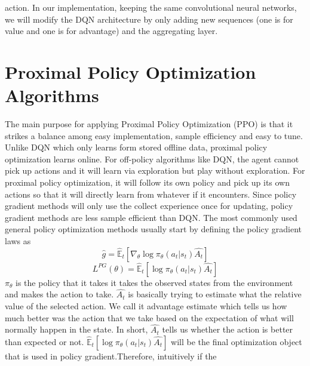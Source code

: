 \documentclass[%
,aps%
 ,twocolumn%
 ,secnumarabic%
,amssymb, amsmath,nobibnotes, aps, prl, floatfix]{revtex4-1}
\begin{document}
action. In our implementation, keeping the same convolutional neural networks, we will modify the DQN architecture by only adding new sequences (one is for value and one is for advantage) and the aggregating layer.

\section{ Proximal Policy Optimization Algorithms}
The main purpose for applying Proximal Policy Optimization (PPO) is that it strikes a balance among easy implementation, sample efficiency and easy to tune. Unlike DQN which only learns form stored offline data, proximal policy optimization learns online. For off-policy algorithms like DQN, the agent cannot pick up actions and it will learn via exploration but play without exploration. For proximal policy optimization, it will follow its own policy and pick up its own actions so that it will directly learn from whatever if it encounters. Since policy gradient methods will only use the collect experience once for updating, policy gradient methods are less sample efficient than DQN. The most commonly used general policy optimization methods usually start by defining the policy gradient laws as $$\hat{g} = \hat{\mathbb{E}}_{t}[\nabla_{\theta}\log\pi_{\theta}(a_{t}|s_{t})\hat{A_t}] $$ 
$$L^{PG}(\theta) = \hat{\mathbb{E}}_{t}[\log\pi_{\theta}(a_{t}|s_{t})\hat{A_t}] $$ $\pi_{\theta}$ is the policy that it takes it takes the observed states from the environment and makes the action to take. $\hat{A_t}$ is basically trying to estimate what the relative value of the selected action. We call it advantage estimate which tells us how much better was the action that we take based on the expectation of what will normally happen in the state. In short, $\hat{A_t}$ tells us whether the action is better than expected or not. $\hat{\mathbb{E}}_{t}[\log\pi_{\theta}(a_{t}|s_{t})\hat{A_t}]$ will be the final optimization object that is used in policy gradient.Therefore, intuitively if the 
\end{document}
